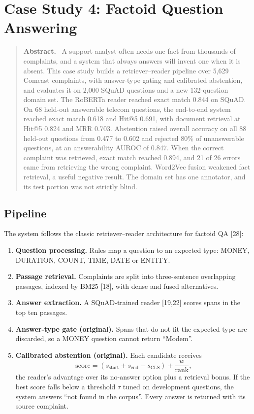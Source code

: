 \documentclass[11pt,a4paper]{article}
\newenvironment{csabstract}{\begin{quote}\small\textbf{Abstract.}\ }{\end{quote}}
\begin{document}
\section{Case Study 4: Factoid Question Answering}\label{sec:qa}
\begin{csabstract}
A support analyst often needs one fact from thousands of complaints, and a system that always answers will invent one when it is absent. This case study builds a retriever--reader pipeline over 5,629 Comcast complaints, with answer-type gating and calibrated abstention, and evaluates it on 2,000 SQuAD questions and a new 132-question domain set. The RoBERTa reader reached exact match 0.844 on SQuAD. On 68 held-out answerable telecom questions, the end-to-end system reached exact match 0.618 and Hit@5 0.691, with document retrieval at Hit@5 0.824 and MRR 0.703. Abstention raised overall accuracy on all 88 held-out questions from 0.477 to 0.602 and rejected 80\% of unanswerable questions, at an answerability AUROC of 0.847. When the correct complaint was retrieved, exact match reached 0.894, and 21 of 26 errors came from retrieving the wrong complaint. Word2Vec fusion weakened fact retrieval, a useful negative result. The domain set has one annotator, and its test portion was not strictly blind.
\end{csabstract}
\subsection{Pipeline}
The system follows the classic retriever--reader architecture for factoid QA [28]:
\begin{enumerate}
\item \textbf{Question processing.} Rules map a question to an expected type: MONEY, DURATION, COUNT, TIME, DATE or ENTITY.
\item \textbf{Passage retrieval.} Complaints are split into three-sentence overlapping passages, indexed by BM25 [18], with dense and fused alternatives.
\item \textbf{Answer extraction.} A SQuAD-trained reader [19,22] scores spans in the top ten passages.
\item \textbf{Answer-type gate (original).} Spans that do not fit the expected type are discarded, so a MONEY question cannot return ``Modem''.
\item \textbf{Calibrated abstention (original).} Each candidate receives
\begin{equation}
\mathrm{score}=(s_{\mathrm{start}}+s_{\mathrm{end}}-s_{\mathrm{CLS}})+\frac{w}{\mathrm{rank}},
\end{equation}
the reader's advantage over its no-answer option plus a retrieval bonus. If the best score falls below a threshold $\tau$ tuned on development questions, the system answers ``not found in the corpus''. Every answer is returned with its source complaint.
\end{enumerate}
\end{document}
